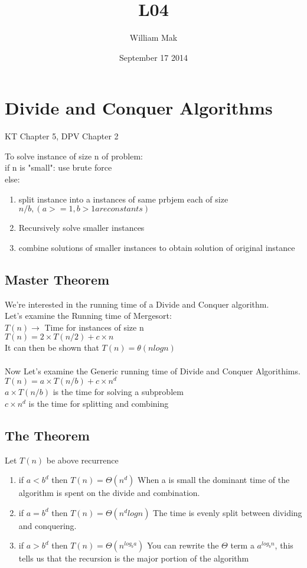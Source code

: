\documentclass{article}
\title{L04}
\author{William Mak}
\date{September 17 2014}
\begin{document}
\maketitle

\section{Divide and Conquer Algorithms}
    KT Chapter 5, DPV Chapter 2
    
    To solve instance of size n of problem:\\
    if n is "small": use brute force\\
    else: 
\begin{enumerate}
    \item split instance into a instances of same prbjem each of size $n/b,(a>=1, b>1 are constants)$
    \item Recursively solve smaller instances
    \item combine solutions of smaller instances to obtain solution of original instance
\end{enumerate}

\subsection{Master Theorem}
We're interested in the running time of a Divide and Conquer algorithm.\\
Let's examine the Running time of Mergesort:\\


$T(n) \to$ Time for instances of size n\\
$T(n) = 2 \times T (n/2) + c\times n$\\
It can then be shown that $T(n) = \theta(nlogn)$\\\\
Now Let's examine the Generic running time of Divide and Conquer Algorithims.\\

$T(n) = a\times T(n/b) + c \times n ^ d$\\
$a \times T(n/b)$ is the time for solving a subproblem\\
$c \times n ^ d$ is the time for splitting and combining\\

\subsection{The Theorem}
Let $T(n)$ be above recurrence
\begin{enumerate}
    \item if $a < b ^ d$ then $T(n) = \Theta(n^d)$
    \subitem When a is small the dominant time of the algorithm is spent on the divide and combination.
    \item if $a = b ^ d$ then $T(n) = \Theta(n^dlogn)$
    \subitem The time is evenly split between dividing and conquering.
    \item if $a > b ^ d$ then $T(n) = \Theta(n^{log_ba})$ 
    \subitem You can rewrite the $\Theta$ term a $a^{log_bn}$, this tells us that the recursion is the major portion of the algorithm
\end{enumerate}
\end{document}
